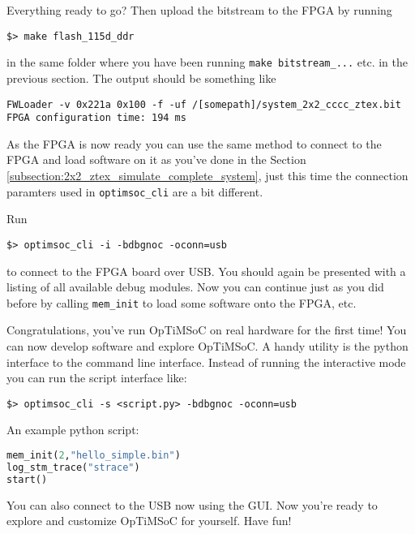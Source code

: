 Everything ready to go? Then upload the bitstream to the FPGA by running

\begin{lstlisting}
$> make flash_115d_ddr
\end{lstlisting}

in the same folder where you have been running \verb|make bitstream_...| etc.
in the previous section. The output should be something like

\begin{lstlisting}
FWLoader -v 0x221a 0x100 -f -uf /[somepath]/system_2x2_cccc_ztex.bit
FPGA configuration time: 194 ms
\end{lstlisting}

As the FPGA is now ready you can use the same method to connect to the
FPGA and load software on it as you've done in the Section
\ref{subsection:2x2_ztex_simulate_complete_system}, just this time the
connection paramters used in \verb|optimsoc_cli| are a bit different.

Run
\begin{lstlisting}
$> optimsoc_cli -i -bdbgnoc -oconn=usb
\end{lstlisting}

to connect to the FPGA board over USB. You should again be presented with a
listing of all available debug modules. Now you can continue just as you did
before by calling \verb|mem_init| to load some software onto the FPGA, etc.

Congratulations, you've run OpTiMSoC on real hardware for the first
time! You can now develop software and explore OpTiMSoC. A handy
utility is the python interface to the command line interface. Instead
of running the interactive mode you can run the script interface like:

\begin{lstlisting}
$> optimsoc_cli -s <script.py> -bdbgnoc -oconn=usb
\end{lstlisting}

An example python script:

\begin{lstlisting}[language=python]
mem_init(2,"hello_simple.bin")
log_stm_trace("strace")
start()
\end{lstlisting}

You can also connect to the USB now using the GUI. Now you're ready to
explore and customize OpTiMSoC for yourself. Have fun!

